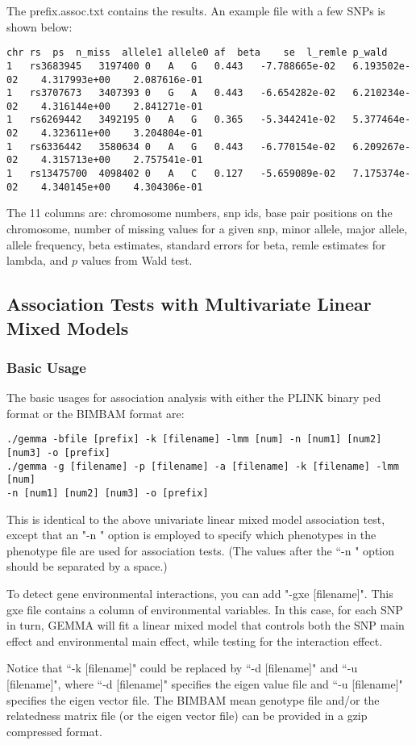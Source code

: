 \documentclass[11pt]{article}
\begin{document}
The prefix.assoc.txt contains the results. An example file with a few SNPs is shown below:
%
\begin{verbatim}
chr	rs	ps	n_miss	allele1	allele0	af	beta	se	l_remle	p_wald
1	rs3683945	3197400	0	A	G	0.443	-7.788665e-02	6.193502e-02	4.317993e+00	2.087616e-01
1	rs3707673	3407393	0	G	A	0.443	-6.654282e-02	6.210234e-02	4.316144e+00	2.841271e-01
1	rs6269442	3492195	0	A	G	0.365	-5.344241e-02	5.377464e-02	4.323611e+00	3.204804e-01
1	rs6336442	3580634	0	A	G	0.443	-6.770154e-02	6.209267e-02	4.315713e+00	2.757541e-01
1	rs13475700	4098402	0	A	C	0.127	-5.659089e-02	7.175374e-02	4.340145e+00	4.304306e-01
\end{verbatim}
%

The 11 columns are: chromosome numbers, snp ids, base pair positions on the chromosome, number of missing values for a given snp, minor allele, major allele, allele frequency, beta estimates, standard errors for beta, remle estimates for lambda, and $p$ values from Wald test. 


\subsection{Association Tests with Multivariate Linear Mixed Models}
\subsubsection{Basic Usage}
The basic usages for association analysis with either the PLINK binary ped format or the BIMBAM format are:
\begin{verbatim}
./gemma -bfile [prefix] -k [filename] -lmm [num] -n [num1] [num2] [num3] -o [prefix]
./gemma -g [filename] -p [filename] -a [filename] -k [filename] -lmm [num] 
-n [num1] [num2] [num3] -o [prefix]
\end{verbatim}
This is identical to the above univariate linear mixed model association test, except that an "-n " option is employed to specify which phenotypes in the phenotype file are used for association tests.  (The values after the ``-n " option should be separated by a space.) 

To detect gene environmental interactions, you can add "-gxe [filename]". This gxe file contains a column of environmental variables. In this case, for each SNP in turn, GEMMA will fit a linear mixed model that controls both the SNP main effect and environmental main effect, while testing for the interaction effect. 

Notice that ``-k [filename]" could be replaced by ``-d [filename]" and ``-u [filename]", where ``-d [filename]" specifies the eigen value file and ``-u [filename]" specifies the eigen vector file. The BIMBAM mean genotype file and/or the relatedness matrix file (or the eigen vector file) can be provided in a gzip compressed format.
\end{document}
